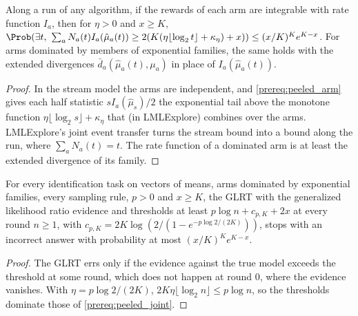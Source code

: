 \begin{lemma}
  \label{prereq:peeled_joint}
  \leanok
  Along a run of any algorithm, if the rewards of each arm are integrable with rate function
  $I_a$, then for $\eta > 0$ and $x \ge K$,
  $\Prob(\exists t,\ \sum_a N_a(t) I_a(\hat\mu_a(t)) \ge
  2(K(\eta \lfloor\log_2 t\rfloor + \kappa_\eta) + x)) \le (x/K)^K e^{K - x}$. For arms dominated
  by members of exponential families, the same holds with the extended divergences
  $\bar d_a(\hat\mu_a(t), \mu_a)$ in place of $I_a(\hat\mu_a(t))$.
\end{lemma}

\begin{proof}
  \leanok
  In the stream model the arms are independent, and \cref{prereq:peeled_arm} gives each half
  statistic $s I_a(\hat\mu_s)/2$ the exponential tail above the monotone function
  $\eta \lfloor\log_2 s\rfloor + \kappa_\eta$ that \cite[Proposition 33.9]{LS} (in LMLExplore)
  combines over the arms. LMLExplore's joint event transfer turns the stream bound into a bound
  along the run, where $\sum_a N_a(t) = t$. The rate function of a dominated arm is at least the
  extended divergence of its family.
\end{proof}

\begin{lemma}
  \label{prereq:deviational_glrt}
  \leanok
  For every identification task on vectors of means, arms dominated by exponential families,
  every sampling rule, $p > 0$ and $x \ge K$, the GLRT with the generalized likelihood ratio
  evidence and thresholds at least $p \log n + c_{p,K} + 2x$ at every round $n \ge 1$, with
  $c_{p,K} = 2K \log(2/(1 - e^{-p\log 2/(2K)}))$, stops with an incorrect answer with
  probability at most $(x/K)^K e^{K-x}$.
\end{lemma}

\begin{proof}
  \leanok
  The GLRT errs only if the evidence against the true model exceeds the threshold at some round,
  which does not happen at round $0$, where the evidence vanishes. With
  $\eta = p\log 2/(2K)$, $2K\eta\lfloor\log_2 n\rfloor \le p \log n$, so the thresholds dominate
  those of \cref{prereq:peeled_joint}.
\end{proof}

